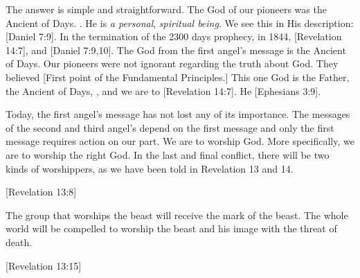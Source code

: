 The answer is simple and straightforward. The God of our pioneers was the Ancient of Days. . He is \textit{a personal}, \textit{spiritual being}. We see this in His description: [Daniel 7:9]. In the termination of the 2300 days prophecy, in 1844, [Revelation 14:7],  and [Daniel 7:9,10]. The God from the first angel’s message is the Ancient of Days. Our pioneers were not ignorant regarding the truth about God. They believed [First point of the Fundamental Principles.] This one God is the Father, the Ancient of Days, , and we are to [Revelation 14:7]. He [Ephesians 3:9].

Today, the first angel’s message has not lost any of its importance. The messages of the second and third angel’s depend on the first message and only the first message requires action on our part. We are to worship God. More specifically, we are to worship the right God. In the last and final conflict, there will be two kinds of worshippers, as we have been told in Revelation 13 and 14.

[Revelation 13:8]

The group that worships the beast will receive the mark of the beast. The whole world will be compelled to worship the beast and his image with the threat of death. 

[Revelation 13:15]

